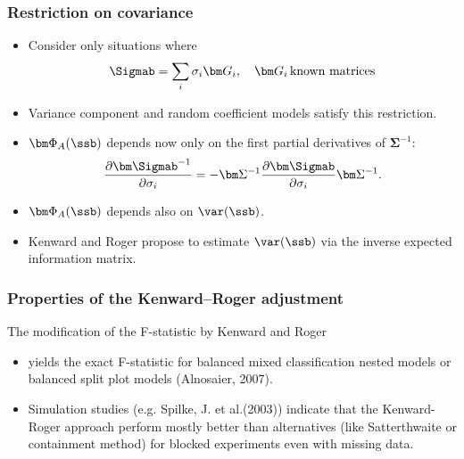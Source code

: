 \begin{sframe}
\frametitle{Restriction on covariance}
\begin{itemize}

\item 
Consider only situations where 
\begin{gather*}
\Sigmab= \sum_i \sigma_i \bm G_i, \quad \bm G_i \, \text{known matrices}
\end{gather*}


\item Variance component and random coefficient models satisfy this
restriction.


\item $\bm \Phi_A(\ssb)$  depends now only on the first  partial derivatives of $\bm \Sigma^{-1}$:
\begin{displaymath}
\frac{\partial \bm \Sigmab^{-1}}{\partial \sigma_i} =
-
\bm \Sigma^{-1}
\frac{\partial \bm \Sigmab}{\partial \sigma_i}
\bm \Sigma^{-1}.  
\end{displaymath}



\item $\bm \Phi_A(\ssb)$  depends also on $\var(\ssb)$.


\item Kenward and Roger propose to estimate
  $\var(\ssb)$ via the  inverse expected information matrix.

\end{itemize}

\end{sframe}

 

\begin{sframe}
  \frametitle{Properties of the Kenward--Roger adjustment}
The  modification of the F-statistic by Kenward and Roger
\begin{itemize}
\item
yields the exact F-statistic for balanced mixed classification nested models
or balanced split plot models (Alnosaier, 2007).
\item
Simulation studies (e.g. Spilke, J. et al.(2003)) indicate that the Kenward-Roger approach perform  mostly better than alternatives  (like Satterthwaite  or containment method) for blocked experiments even with missing data. 
\end{itemize}
\end{sframe}



